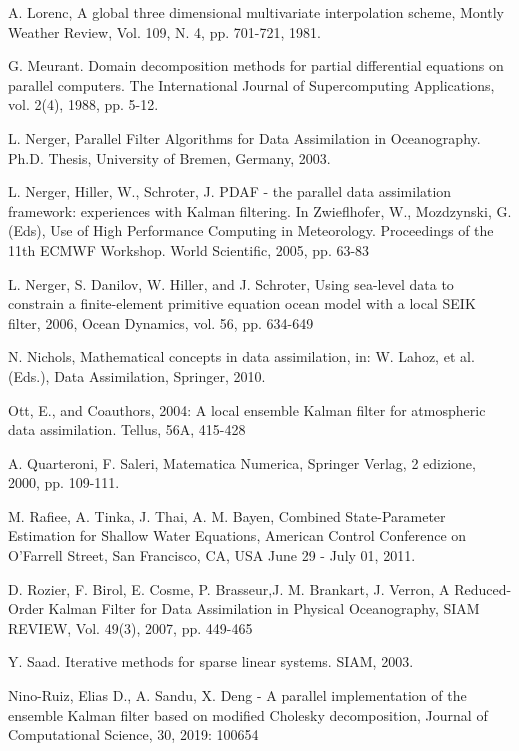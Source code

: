 \documentclass[smallcondensed]{svjour3}
\begin{document}
\begin{thebibliography}{99}
A. Lorenc, A global three dimensional multivariate interpolation scheme, Montly Weather Review, Vol. 109, N. 4, pp. 701-721, 1981.


 G. Meurant. Domain decomposition methods for partial differential equations on parallel
computers. The International Journal of Supercomputing Applications, vol. 2(4), 1988, pp. 5-12.


 L. Nerger, Parallel Filter Algorithms for Data Assimilation in Oceanography. Ph.D. Thesis, University of Bremen, Germany, 2003.

 L. Nerger, Hiller, W., Schroter, J. PDAF - the parallel data assimilation framework: experiences with Kalman filtering. In Zwieflhofer, W., Mozdzynski, G. (Eds), Use of High Performance Computing in Meteorology. Proceedings of the 11th ECMWF Workshop. World Scientific, 2005,  pp. 63-83


 L. Nerger, S. Danilov, W. Hiller, and
J. Schroter,  Using sea-level data to constrain a finite-element primitive equation ocean model with a local SEIK
filter, 2006, Ocean Dynamics, vol. 56, pp. 634-649


  N. Nichols, Mathematical concepts in data assimilation, in: W. Lahoz, et al. (Eds.), Data Assimilation, Springer, 2010.

 Ott, E., and Coauthors, 2004: A local ensemble Kalman filter for atmospheric data assimilation. Tellus, 56A, 415-428

 A. Quarteroni, F. Saleri, Matematica Numerica, Springer Verlag, 2 edizione, 2000, pp. 109-111.


 M. Rafiee, A. Tinka,  J. Thai, A. M. Bayen, Combined State-Parameter Estimation for Shallow Water Equations,  American Control Conference
on O'Farrell Street, San Francisco, CA, USA
June 29 - July 01, 2011.

 D. Rozier, F. Birol, E. Cosme, P. Brasseur,J. M. Brankart, J. Verron, A Reduced-Order Kalman Filter for Data Assimilation in Physical Oceanography, SIAM REVIEW, Vol. 49(3), 2007, pp. 449-465

 Y. Saad. Iterative methods for sparse linear systems. SIAM, 2003.

 Nino-Ruiz, Elias D., A. Sandu, X. Deng - A parallel implementation of the ensemble Kalman filter based on modified Cholesky decomposition, Journal of Computational Science, 30, 2019: 100654




\end{thebibliography}
\end{document}
